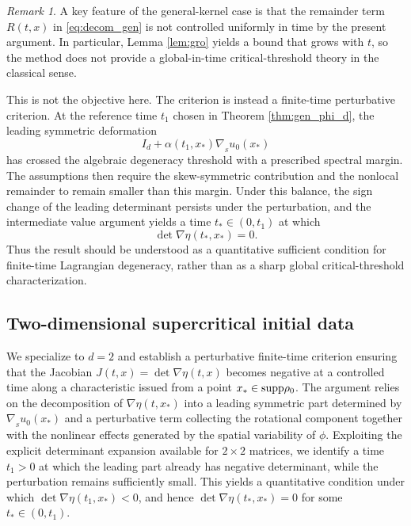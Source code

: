 \documentclass[11pt]{amsart}
\numberwithin{equation}{section}
\theoremstyle{definition}
\theoremstyle{remark}
\newtheorem{remark}[theorem]{Remark}
\numberwithin{equation}{section}
\newtheorem{remark}[theorem]{Remark}
\newcommand{\supp}{{\rm supp}}
\newcommand{\nabS}{\nabla_{\!\!{}_S}}
\begin{document}
\begin{remark} 
A key feature of the general-kernel case is that the remainder term $R(t,x)$ in \eqref{eq:decom_gen} is not controlled uniformly in time by the present argument. In particular, Lemma \ref{lem:gro} yields a bound that grows with $t$, so the method does not provide a global-in-time critical-threshold theory in the classical sense.

This is not the objective here. The criterion is instead a finite-time perturbative criterion. At the reference time $t_1$ chosen in Theorem \ref{thm:gen_phi_d}, the leading symmetric deformation
\[
I_d+\alpha(t_1,x_*)\nabS u_0(x_*)
\]
has crossed the algebraic degeneracy threshold with a prescribed spectral margin. The assumptions then require the skew-symmetric contribution and the nonlocal remainder to remain smaller than this margin. Under this balance, the sign change of the leading determinant persists under the perturbation, and the intermediate value argument yields a time $t_*\in(0,t_1)$ at which
\[
\det\nabla\eta(t_*,x_*)=0.
\]
Thus the result should be understood as a quantitative sufficient condition for finite-time Lagrangian degeneracy, rather than as a sharp global critical-threshold characterization.
\end{remark}
 

 
%
%
%                       
%
%

\subsection{Two-dimensional supercritical initial data}

We specialize to $d=2$ and establish a   perturbative finite-time criterion ensuring that the Jacobian $J(t,x)=\det\nabla\eta(t,x)$ becomes negative at a controlled time   along a characteristic issued from a point $x_*\in\supp\rho_0$. The argument relies on the decomposition of $\nabla\eta(t,x_*)$ into a leading symmetric part determined by $\nabS u_0(x_*)$ and a perturbative term collecting the rotational component together with the nonlinear effects generated by the spatial variability of $\phi$. Exploiting the explicit determinant expansion available for $2\times2$ matrices, we identify a time $t_1>0$ at which the leading part already has negative determinant, while the perturbation remains sufficiently small. This yields a quantitative condition under which $\det\nabla\eta(t_1,x_*)<0$, and hence $\det\nabla\eta(t_*,x_*)=0$ for some $t_*\in(0,t_1)$. 
  
\end{document}
